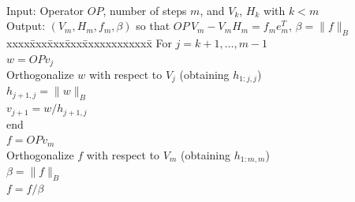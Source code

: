 \begin{algorithm}~\rm
\begin{tabbing}
Input: Operator $O\!P$, number of steps $m$, and $V_k$, $H_k$ with $k<m$  \\
Output: $(V_m,H_m,f_m,\beta)$ so that $O\!P\,V_m-V_mH_m=f_me_m^T$, $\beta=\|f\|_B$ \\
xxxx\=xxx\=xxx\=xxx\=xxxxxxxxxxxx\=\kill
\> For $j=k+1,\ldots,m-1$\\
\> \> $w=O\!Pv_j$ \\
\> \> Orthogonalize $w$ with respect to $V_j$ (obtaining $h_{1:j,j}$) \\
\> \> $h_{j+1,j}=\|w\|_B$ \\
\> \> $v_{j+1}=w/h_{j+1,j}$ \\
\> end \\
\> $f=O\!Pv_m$ \\
\> Orthogonalize $f$ with respect to $V_m$ (obtaining $h_{1:m,m}$) \\
\> $\beta=\|f\|_B$ \\
\> $f=f/\beta$ \\
\end{tabbing}
\end{algorithm}

%

